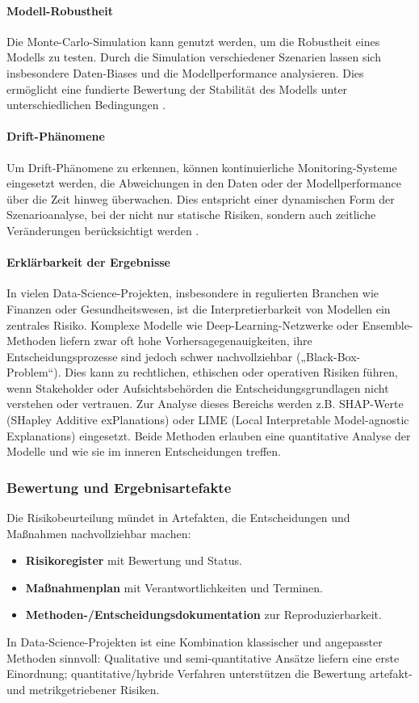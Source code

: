 \paragraph*{Modell-Robustheit}
Die Monte-Carlo-Simulation kann genutzt werden, um die Robustheit eines Modells zu testen. 
Durch die Simulation verschiedener Szenarien lassen sich insbesondere Daten-Biases 
und die Modellperformance analysieren. 
Dies ermöglicht eine fundierte Bewertung der Stabilität des Modells unter unterschiedlichen Bedingungen \citep{gleisner_risikoaggregation_2019}.
\paragraph*{Drift-Phänomene}
Um Drift-Phänomene zu erkennen, können kontinuierliche Monitoring-Systeme eingesetzt werden, 
die Abweichungen in den Daten oder der Modellperformance über die Zeit hinweg überwachen. 
Dies entspricht einer dynamischen Form der Szenarioanalyse, bei der nicht nur statische Risiken, 
sondern auch zeitliche Veränderungen berücksichtigt werden \citep{pelosi_explainability_2025}.
\paragraph*{Erklärbarkeit der Ergebnisse}
In vielen Data-Science-Projekten, insbesondere in regulierten Branchen wie Finanzen oder Gesundheitswesen, 
ist die Interpretierbarkeit von Modellen ein zentrales Risiko. 
Komplexe Modelle wie Deep-Learning-Netzwerke oder Ensemble-Methoden liefern zwar oft hohe Vorhersagegenauigkeiten, 
ihre Entscheidungsprozesse sind jedoch schwer nachvollziehbar („Black-Box-Problem“). 
Dies kann zu rechtlichen, ethischen oder operativen Risiken führen, 
wenn Stakeholder oder Aufsichtsbehörden die Entscheidungsgrundlagen nicht verstehen oder vertrauen.
Zur Analyse dieses Bereichs werden z.B. SHAP-Werte (SHapley Additive exPlanations) \citep{lundberg_unified_2017} oder 
LIME (Local Interpretable Model-agnostic Explanations) \citep{ribeiro_why_2016} eingesetzt. Beide Methoden erlauben eine 
quantitative Analyse der Modelle und wie sie im inneren Entscheidungen treffen.

\subsubsection*{Bewertung und Ergebnisartefakte}
Die Risikobeurteilung mündet in Artefakten, die Entscheidungen und Maßnahmen nachvollziehbar machen:
\begin{itemize}
    \item \textbf{Risikoregister} mit Bewertung und Status.
    \item \textbf{Maßnahmenplan} mit Verantwortlichkeiten und Terminen.
    \item \textbf{Methoden-/Entscheidungsdokumentation} zur Reproduzierbarkeit.
\end{itemize}

In Data-Science-Projekten ist eine Kombination klassischer und angepasster Methoden sinnvoll:
Qualitative und semi-quantitative Ansätze liefern eine erste Einordnung; quantitative/hybride Verfahren
unterstützen die Bewertung artefakt- und metrikgetriebener Risiken.
